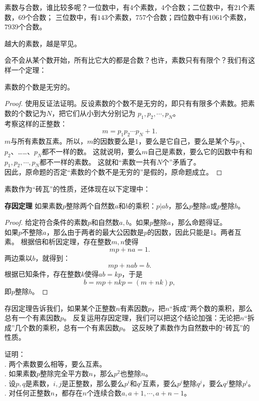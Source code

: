 \documentclass[12pt,UTF8]{ctexbook}
\begin{document}
素数与合数，谁比较多呢？一位数中，有$4$个素数，$4$个合数；二位数中，有$21$个素数，$69$个合数；
三位数中，有$143$个素数，$757$个合数；四位数中有$1061$个素数，$7939$个合数。

越大的素数，越是罕见。

会不会从某个数开始，所有比它大的都是合数？也许，素数只有有限个？我们有这样一个定理：

\begin{tm}\label{tm:1-0-10}
    素数的个数是无穷的。
\end{tm}
\begin{proof}
    使用反证法证明。反设素数的个数不是无穷的，即只有有限多个素数。把素数的个数记为$N$，把它们从小到大分别记为
    $p_1, p_2,\cdots , p_N$。\\
    考察这样的正整数：
    $$ m = p_1p_2\cdots p_N + 1.$$
    $m$与所有素数互素。所以，$m$的因数要么是$1$，要么是它自己，要么是某个与$p_1$、$p_2$、……、$p_N$都不一样的数。
    这就说明，要么$m$自己是素数，要么它的因数中有和$p_1, p_2,\cdots , p_N$都不一样的素数。
    这就和“素数一共有$N$个”矛盾了。\\
    因此，原命题的否定“素数的个数不是无穷的”是假的，原命题成立。
\end{proof}

素数作为“砖瓦”的性质，还体现在以下定理中：
\begin{tm}{\textbf{存因定理 }}\label{tm:1-0-20}
    如果素数$p$整除两个自然数$a$和$b$的乘积：$p | ab$，那么$p$整除$a$或$p$整除$b$。
\end{tm}
\begin{proof}
    给定符合条件的素数$p$和自然数$a,b$。如果$p$整除$a$，那么命题得证。\\
    如果$p$不整除$a$，那么由于两者的最大公因数是$p$的因数，因此只能是$1$。两者互素。
    根据倍和析因定理，存在整数$m,n$使得
    $$ mp + na = 1.$$
    两边乘以$b$，就得到：
    $$ mp + nab = b. $$
    根据已知条件，存在整数$k$使得$ab = kp$，于是 
    $$ b = mp + nkp = (m + nk)p,$$
    即$p$整除$b$。
\end{proof}

存因定理告诉我们，如果某个正整数$n$有素因数$p$，把$n$“拆成”两个数的乘积，那么总有一个有素因数$p$。
反复运用存因定理，我们可以把这个结论加强：无论把$n$“拆成”几个数的乘积，总有一个有素因数$p$。
这反映了素数作为自然数中的“砖瓦”的性质。

\begin{xt}\label{xt:1-0-0}
    证明：\\
    . 两个素数要么相等，要么互素。\\
    . 如果素数$p$整除完全平方数$n$，那么$p^2$也整除$n$。\\
    . 设$p,q$是素数，$i,j$是正整数，那么要么$p^i$和$q^j$互素，要么$p^i$整除$q^j$，要么$q^j$整除$p^i$。\\
    . 对任何正整数$n$，都存在$n$个连续合数$a, a+1, \cdots , a+n-1$。
\end{xt}
\end{document}
